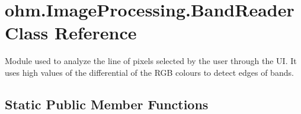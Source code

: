 \hypertarget{classohm_1_1_image_processing_1_1_band_reader}{}\section{ohm.\+Image\+Processing.\+Band\+Reader Class Reference}
\label{classohm_1_1_image_processing_1_1_band_reader}


Module used to analyze the line of pixels selected by the user through the UI. It uses high values of the differential of the R\+GB colours to detect edges of bands.  


\subsection*{Static Public Member Functions}

